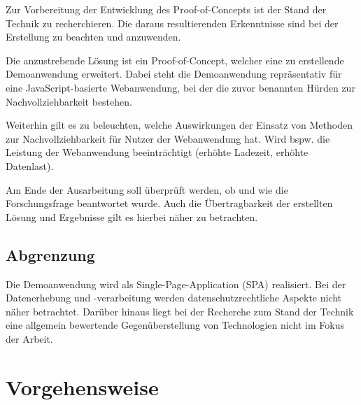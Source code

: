 Zur Vorbereitung der Entwicklung des Proof-of-Concepts ist der Stand der Technik zu recherchieren. Die daraus resultierenden Erkenntnisse sind bei der Erstellung zu beachten und anzuwenden.

Die anzustrebende Lösung ist ein Proof-of-Concept, welcher eine zu erstellende Demoanwendung erweitert. Dabei steht die Demoanwendung repräsentativ für eine JavaScript-basierte Webanwendung, bei der die zuvor benannten Hürden zur Nachvollziehbarkeit bestehen.

Weiterhin gilt es zu beleuchten, welche Auswirkungen der Einsatz von Methoden zur Nachvollziehbarkeit für Nutzer der Webanwendung hat. Wird bspw. die Leistung der Webanwendung beeinträchtigt (erhöhte Ladezeit, erhöhte Datenlast).

Am Ende der Ausarbeitung soll überprüft werden, ob und wie die Forschungsfrage beantwortet wurde. Auch die Übertragbarkeit der erstellten Lösung und Ergebnisse gilt es hierbei näher zu betrachten.

\subsection{Abgrenzung}


Die Demoanwendung wird als Single-Page-Application (SPA) \cite{SinglePageApplication} realisiert. Bei der Datenerhebung und -verarbeitung werden datenschutzrechtliche Aspekte nicht näher betrachtet. Darüber hinaus liegt bei der Recherche zum Stand der Technik eine allgemein bewertende Gegenüberstellung von Technologien nicht im Fokus der Arbeit.

\pagebreak

\section{Vorgehensweise}

\vspace{-0.25\baselineskip}

